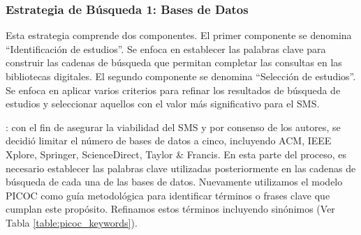 
\newcommand{\acm}{518}
\newcommand{\ieee}{0}
\newcommand{\sd}{120}
\newcommand{\spr}{209}
\newcommand{\tf}{0}
\newcommand{\tot}{847}
\newcommand{\acmp}{\fpeval{round(\acm*100/\tot,2)}}
\newcommand{\ieeep}{\fpeval{round(\ieee*100/\tot,2)}}
\newcommand{\sdp}{\fpeval{round(\sd*100/\tot,2)}}
\newcommand{\sprp}{\fpeval{round(\spr*100/\tot,2)}}
\newcommand{\tfp}{\fpeval{round(\tf*100/\tot,2)}}


\newcommand{\iacm}{315}
\newcommand{\iieee}{0}
\newcommand{\isd}{101}
\newcommand{\ispr}{63}
\newcommand{\itf}{0}
\newcommand{\itot}{479}
\newcommand{\iacmp}{\fpeval{round(\iacm*100/\itot,2)}}
\newcommand{\iieeep}{\fpeval{round(\iieee*100/\itot,2)}}
\newcommand{\isdp}{\fpeval{round(\isd*100/\itot,2)}}
\newcommand{\isprp}{\fpeval{round(\ispr*100/\itot,2)}}
\newcommand{\itfp}{\fpeval{round(\itf*100/\itot,2)}}

\newcommand{\numEstEx}{3}

\newcommand{\depTot}{\fpeval{\itot-\numEstEx}}

\newcommand{\screen}{377}
\newcommand{\screenTot}{\fpeval{\depTot-\screen}}

\subsubsection{Estrategia de Búsqueda 1: Bases de Datos}

Esta estrategia comprende dos componentes. El primer componente se denomina ``Identificación de estudios''. Se enfoca en establecer las palabras clave para construir las cadenas de búsqueda que permitan completar las consultas en las bibliotecas digitales. El segundo componente se denomina ``Selección de estudios''. Se enfoca en aplicar varios criterios para refinar los resultados de búsqueda de estudios y seleccionar aquellos con el valor más significativo para el SMS.\@

: con el fin de asegurar la viabilidad del SMS y por consenso de los autores, se decidió limitar el número de bases de datos a cinco, incluyendo ACM, IEEE Xplore, Springer, ScienceDirect, Taylor \& Francis. En esta parte del proceso, es necesario establecer las palabras clave utilizadas posteriormente en las cadenas de búsqueda de cada una de las bases de datos. Nuevamente utilizamos el modelo PICOC como guía metodológica para identificar términos o frases clave que cumplan este propósito. Refinamos estos términos incluyendo sinónimos (Ver Tabla \ref{table:picoc_keywords}).

